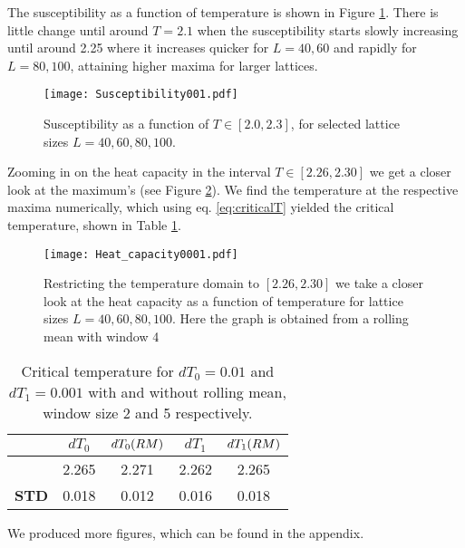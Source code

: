 The susceptibility as a function of temperature is shown in Figure \ref{fig:susceptibility001}. There is little change until around $T=2.1$ when the susceptibility starts slowly increasing until around 2.25 where it increases quicker for $L=40, 60$ and rapidly for $L=80, 100$, attaining higher maxima for larger lattices.
\begin{figure}[htbp]
	\centering
	\texttt{[image: Susceptibility001.pdf]}
	\caption{Susceptibility as a function of $T \in[2.0, 2.3]$, for selected lattice sizes $L = 40, 60, 80, 100$.}
	\label{fig:susceptibility001}
\end{figure}

Zooming in on the heat capacity in the interval $T \in [2.26, 2.30]$ we get a closer look at the maximum's (see Figure \ref{fig:heatcap}). We find the temperature at the respective maxima numerically, which using eq. \ref{eq:criticalT} yielded the critical temperature, shown in Table \ref{table:Tmax}.
\begin{figure}[htbp]
	\centering
	\texttt{[image: Heat\_capacity0001.pdf]}
	\caption{Restricting the temperature domain to $[2.26, 2.30]$ we take a closer look at the heat capacity as a function of temperature for lattice sizes $L=40, 60, 80, 100$. Here the graph is obtained from a rolling mean with window 4}
	\label{fig:heatcap}
\end{figure}

\begin{table}[htbp]
	\centering
	\begin{tabular}{l|cccc}
		\bm{$dT$} & $dT_0$ & $dT_0 \qty(RM)$ & $dT_1$ & $dT_1 \qty(RM)$  \\
		\midrule

		\bm{$T_C$} & 2.265 & 2.271 & 2.262 & 2.265 \\
		\textbf{STD} & 0.018 & 0.012 & 0.016 & 0.018 \\
	\end{tabular}
	\caption{Critical temperature for $dT_0 = 0.01$ and $dT_1 = 0.001$ with and without rolling mean, window size 2 and 5 respectively.}
	\label{table:Tmax}
\end{table}

We produced more figures, which can be found in the appendix.

